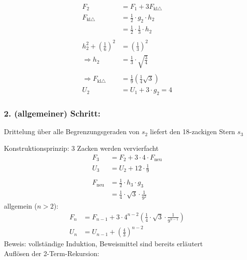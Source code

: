 \begin{center}
\end{center}

\begin{align*}
    F_2 &= F_1 + 3 F_{\text{kl} \triangle} \\
    F_{\text{kl} \triangle} &= \frac{1}{2} \cdot g_2 \cdot h_2 \\
    &= \frac{1}{2} \cdot \frac{1}{3} \cdot h_2 \\
\\
    h_2^2 + \left( \frac{1}{6} \right)^2 &= \left( \frac{1}{3} \right)^2 \\
    \Rightarrow h_2 &= \frac{1}{3} \cdot \sqrt{ \frac{3}{4} } \\
\\
    \Rightarrow F_{\text{kl} \triangle} &= \frac{1}{9} \left( \frac{1}{4} \sqrt{3} \right)
\\
    U_2 &= U_1 + 3 \cdot g_2 = 4
\end{align*}

\subsubsection*{2. (allgemeiner) Schritt:}
Drittelung über alle Begrenzungsgeraden von $s_2$ liefert den 18-zackigen Stern $s_3$
%
\begin{center}
\end{center}
%
Konstruktionsprinzip: 3 Zacken werden vervierfacht
%
\begin{align*}
    F_3 &= F_2 + 3 \cdot 4 \cdot F_{\text{neu}} \\
    U_3 &= U_2 + 12 \cdot \frac{1}{9} \\
\\
    F_{\text{neu}} &= \frac{1}{2} \cdot h_3 \cdot g_3 \\
    &= \frac{1}{4} \cdot \sqrt{3} \cdot \frac{1}{9^2}
\end{align*}
%
allgemein ($n > 2$):
\begin{align*}
    F_n &= F_{n-1} + 3 \cdot 4^{n-2} \left( \frac{1}{4} \cdot \sqrt{3} \cdot \frac{1}{9^{n-1}} \right) \\
    U_n &= U_{n-1} + \left( \frac{4}{3} \right)^{n-2}
\end{align*}
%
Beweis: vollständige Induktion, Beweismittel sind bereits erläutert\\
Auflösen der 2-Term-Rekursion:

